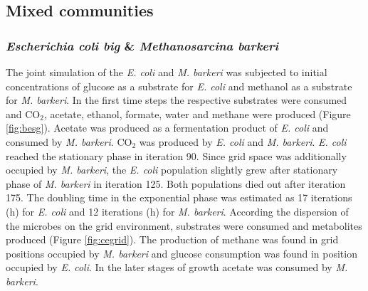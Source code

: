 \subsection{Mixed communities}
\subsubsection{\textit{Escherichia coli big} \& \textit{Methanosarcina barkeri}}
The joint simulation of the \textit{E. coli} and \textit{M. barkeri} was subjected to initial concentrations of glucose as a substrate for \textit{E. coli} and methanol as a substrate for \textit{M. barkeri}. In the first time steps the respective substrates were consumed and CO$_2$, acetate, ethanol, formate, water and methane were produced (Figure \hyperref[fig:besg]{\ref{fig:besg}}). Acetate was produced as a fermentation product of \textit{E. coli} and consumed by \textit{M. barkeri}. CO$_2$ was produced by \textit{E. coli} and \textit{M. barkeri}. \textit{E. coli} reached the stationary phase in iteration 90.
Since grid space was additionally occupied by \textit{M. barkeri}, the \textit{E. coli} population slightly grew after stationary phase of \textit{M. barkeri} in iteration 125. Both populations died out after iteration 175.
The doubling time in the exponential phase was estimated as 17 iterations (h) for \textit{E. coli} and 12 iterations (h) for \textit{M. barkeri}.
According the dispersion of the microbes on the grid environment, substrates were consumed and metabolites produced (Figure \hyperref[fig:cegrid]{\ref{fig:cegrid}}). The production of methane was found in grid positions occupied by \textit{M. barkeri} and glucose consumption was found in position occupied by \textit{E. coli}. In the later stages of growth acetate was consumed by \textit{M. barkeri}.
